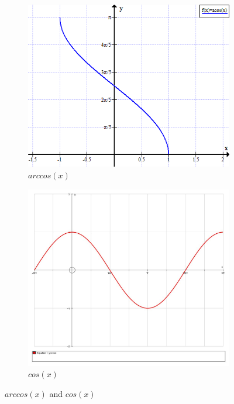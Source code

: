 \documentclass[10pt]{article}
\begin{document}
\begin{figure}[h!]
  \centering
  \begin{subfigure}[b]{0.4\linewidth}
    \includegraphics[width=\linewidth]{image/arccos.png}
    \caption{$arccos(x)$}
  \end{subfigure}
  \begin{subfigure}[b]{0.4\linewidth}
    \includegraphics[width=\linewidth]{image/cos.jpg}
    \caption{$cos(x)$}
  \end{subfigure}
  \caption{$arccos(x)$ and $cos(x)$}
  \label{fig:coffee}
\end{figure}
\end{document}
